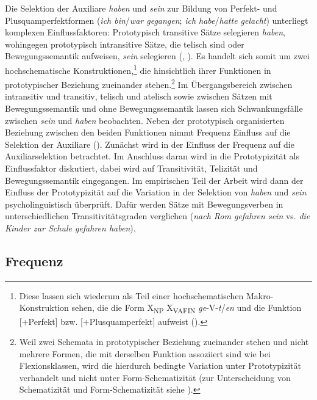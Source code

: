 \begin{sloppypar}
Die Selektion der Auxiliare \textit{haben} und \textit{sein} zur Bildung von Perfekt- und Plusquamperfektformen (\textit{ich bin}/\textit{war gegangen}; \textit{ich habe}/\textit{hatte gelacht}) unterliegt komplexen Einflussfaktoren: Prototypisch transitive Sätze selegieren \textit{haben}, wohingegen prototypisch intransitive Sätze, die telisch sind oder Bewegungssemantik aufweisen, \textit{sein} selegieren (\cite{Shannon.1992, Shannon.1995}, \cite[316--319]{Gillmann.2016}). Es handelt sich somit um zwei hochschematische Konstruktionen,\footnote{Diese lassen sich wiederum als Teil einer hochschematischen Makro-Konstruktion sehen, die die Form X\textsubscript{NP} X\textsubscript{VAFIN} \textit{ge}-V-\textit{t}/\textit{en} und die Funktion [+Perfekt] bzw. [+Plusquamperfekt] aufweist (\cite[240]{Gillmann.2018}).} die hinsichtlich ihrer Funktionen in prototypischer Beziehung zueinander stehen.\footnote{Weil zwei Schemata in prototypischer Beziehung zueinander stehen und nicht mehrere Formen, die mit derselben Funktion assoziiert sind wie bei Flexionsklassen, wird die hierdurch bedingte Variation unter Prototypizität verhandelt und nicht unter Form-Schematizität (zur Unterscheidung von Schematizität und Form-Schematizität siehe ).} Im Übergangsbereich zwischen intransitiv und transitiv, telisch und atelisch sowie zwischen Sätzen mit Bewegungssemantik und ohne Bewegungssemantik lassen sich Schwankungsfälle zwischen \textit{sein} und \textit{haben} beobachten.  Neben der prototypisch organisierten Beziehung zwischen den beiden Funktionen nimmt Frequenz Einfluss auf die Selektion der Auxiliare (\cite[253--255; 265--268]{Gillmann.2016}). Zunächst wird in  der Einfluss der Frequenz auf die Auxiliarselektion betrachtet. Im Anschluss daran wird in  die Prototypizität als Einflussfaktor diskutiert, dabei wird auf Transitivität, Telizität und Bewegungssemantik eingegangen. Im empirischen Teil der Arbeit wird dann der Einfluss der Prototypizität auf die Variation in der Selektion von \textit{\textit{haben}} und \textit{sein} psycholinguistisch überprüft. Dafür werden Sätze mit Bewegungsverben in unterschiedlichen Transitivitätsgraden verglichen (\textit{nach Rom gefahren sein} vs. \textit{die Kinder zur Schule gefahren haben}).
\end{sloppypar}

\subsection{Frequenz}\label{selfreq}

